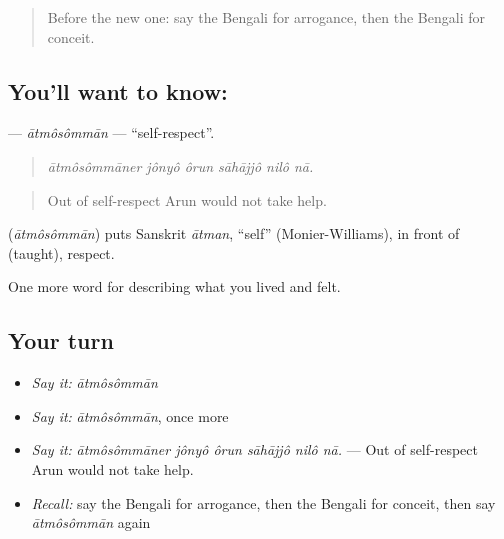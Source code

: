 \label{lesson:BN-C452-atmosomman}



\begin{quote}
Before the new one: say the Bengali for arrogance, then the Bengali for conceit.
\end{quote}

\subsection*{You'll want to know: }
\textbf{} — \emph{ātmôsômmān} — \textquotedblleft{}self-respect\textquotedblright{}.

\begin{quote}
     
\end{quote}

\begin{quote}
\emph{ātmôsômmāner jônyô ôrun sāhājjô nilô nā.}
\end{quote}

\begin{quote}
Out of self-respect Arun would not take help.
\end{quote}

\begin{cousinweb}
\textbf{} (\emph{ātmôsômmān}) puts Sanskrit \emph{ātman}, \textquotedblleft{}self\textquotedblright{} (Monier-Williams), in front of  (taught), respect.
\end{cousinweb}

\begin{grammarlens}[title={What you've built}]
One more word for describing what you lived and felt.
\end{grammarlens}

\subsection*{Your turn}
\begin{itemize}
\raggedright
  \item \emph{Say it:} \emph{ātmôsômmān}
  \item \emph{Say it:} \emph{ātmôsômmān}, once more
  \item \emph{Say it:} \emph{ātmôsômmāner jônyô ôrun sāhājjô nilô nā.} — Out of self-respect Arun would not take help.
  \item \emph{Recall:} say the Bengali for arrogance, then the Bengali for conceit, then say \emph{ātmôsômmān} again
\end{itemize}

